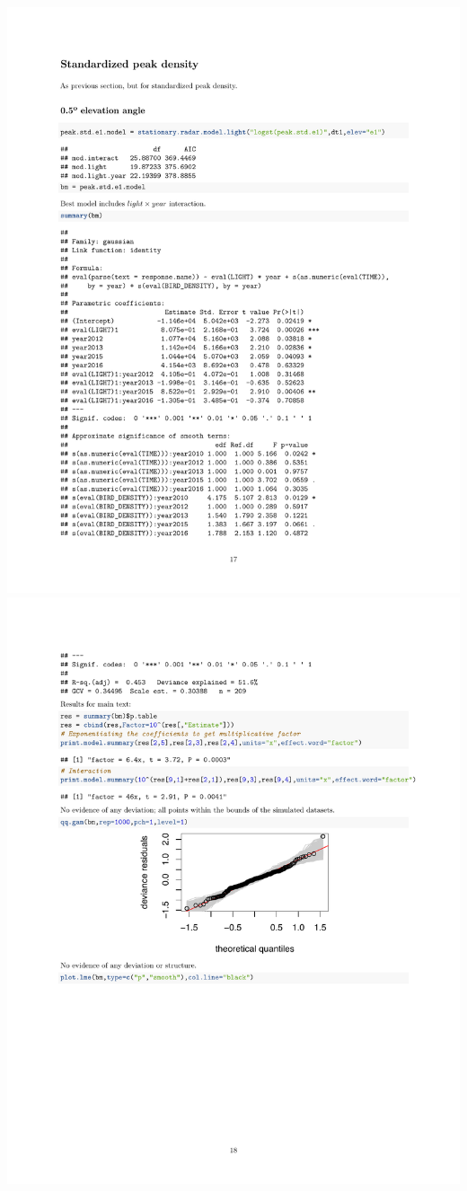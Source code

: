 \documentclass[a4paper, twoside]{templates/ociamthesis}
\begin{document}
\includegraphics[width=1\linewidth]{pdf_chapters/lights/lights_supp_crop_Part51}
\includegraphics[width=1\linewidth]{pdf_chapters/lights/lights_supp_crop_Part52}
\end{document}
